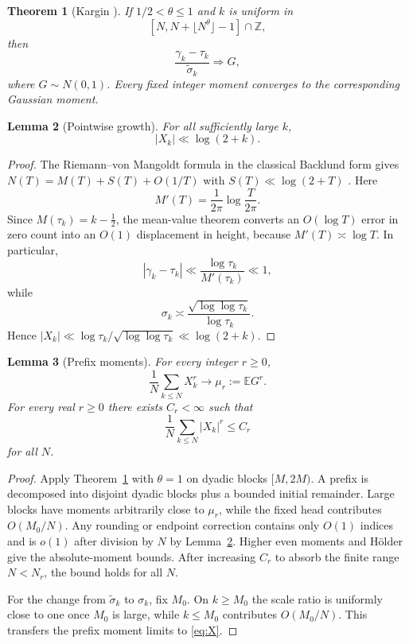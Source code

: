 \documentclass[pdflatex,sn-mathphys-num]{sn-jnl}
\numberwithin{equation}{section}
\theoremstyle{thmstyleone}
\newtheorem{theorem}{Theorem}[section]
\newtheorem{lemma}[theorem]{Lemma}
\theoremstyle{thmstylethree}
\theoremstyle{thmstyletwo}
\newcommand{\Z}{\mathbb Z}
\newcommand{\E}{\mathbb E}
\newcommand{\1}{\mathbf 1}
\begin{document}
\begin{theorem}[Kargin {\cite{Kargin2013}}]
\label{thm:kargin}
If $1/2<\theta\le1$ and $k$ is uniform in
\[
 [N,N+\lfloor N^\theta\rfloor-1]\cap\Z,
\]
then
\[
 \frac{\gamma_k-\tau_k}{\widetilde\sigma_k}\Longrightarrow G,
\]
where $G\sim N(0,1)$.  Every fixed integer moment converges to the corresponding Gaussian moment.
\end{theorem}

\begin{lemma}[Pointwise growth]
\label{lem:pointwiseX}
For all sufficiently large \(k\),
\[
 |X_k|\ll \log(2+k).
\]
\end{lemma}

\begin{proof}
The Riemann--von Mangoldt formula in the classical Backlund form gives
\(N(T)=M(T)+S(T)+O(1/T)\) with \(S(T)\ll\log(2+T)\)
\cite[Ch.~IX]{Titchmarsh1986}.  Here
\[
 M'(T)=\frac{1}{2\pi}\log\frac{T}{2\pi}.
\]
Since \(M(\tau_k)=k-\tfrac12\), the mean-value theorem converts an
\(O(\log T)\) error in zero count into an \(O(1)\) displacement in height,
because \(M'(T)\asymp\log T\).  In particular,
\[
 |\gamma_k-\tau_k|\ll \frac{\log \tau_k}{M'(\tau_k)}
 \ll 1,
\]
while
\[
 \sigma_k\asymp\frac{\sqrt{\log\log\tau_k}}{\log\tau_k}.
\]
Hence \( |X_k|\ll \log\tau_k/\sqrt{\log\log\tau_k}\ll\log(2+k)\).
\end{proof}

\begin{lemma}[Prefix moments]
\label{lem:prefix}
For every integer $r\ge0$,
\[
 \frac1N\sum_{k\le N}X_k^r\longrightarrow \mu_r:=\E G^r.
\]
For every real $r\ge0$ there exists $C_r<\infty$ such that
\[
 \frac1N\sum_{k\le N}|X_k|^r\le C_r
\]
for all $N$.
\end{lemma}

\begin{proof}
Apply Theorem~\ref{thm:kargin} with $\theta=1$ on dyadic blocks $[M,2M)$.  A prefix is decomposed into disjoint dyadic blocks plus a bounded initial remainder.  Large blocks have moments arbitrarily close to $\mu_r$, while the fixed head contributes $O(M_0/N)$.  Any rounding or endpoint correction contains only $O(1)$ indices and is $o(1)$ after division by $N$ by Lemma~\ref{lem:pointwiseX}.  Higher even moments and H\"older give the absolute-moment bounds.  After
increasing \(C_r\) to absorb the finite range \(N<N_r\), the bound holds for
all \(N\).

For the change from $\widetilde\sigma_k$ to $\sigma_k$, fix $M_0$.  On $k\ge M_0$ the scale ratio is uniformly close to one once $M_0$ is large, while $k\le M_0$ contributes $O(M_0/N)$.  This transfers the prefix moment limits to \eqref{eq:X}.
\end{proof}
\end{document}
